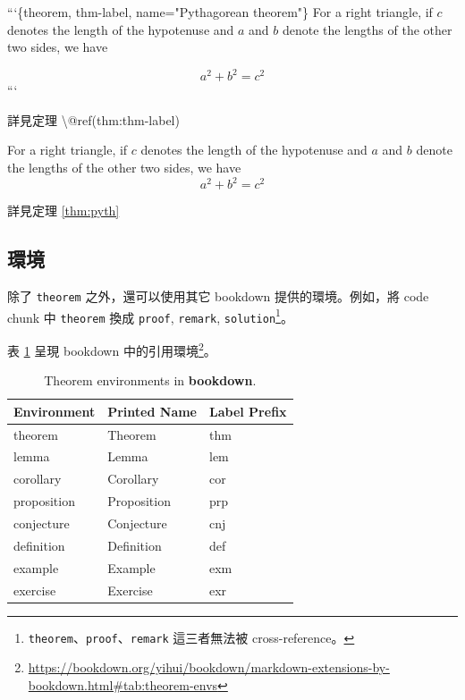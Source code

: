 \documentclass[oneside]{book}
\newenvironment{Shaded}{\begin{snugshade}}{\end{snugshade}}
\newcommand{\BaseNTok}[1]{\textcolor[rgb]{0.00,0.00,0.81}{#1}}
\newcommand{\NormalTok}[1]{#1}
\renewcommand{\href}[2]{#2\footnote{\url{#1}}}
\theoremstyle{definition}
\theoremstyle{definition}
\theoremstyle{definition}
\theoremstyle{remark}
\let\BeginKnitrBlock\begin \let\EndKnitrBlock\end
\begin{document}
\begin{Shaded}
\begin{Highlighting}[]
\BaseNTok{```\{theorem, thm-label, name="Pythagorean theorem"\}}
\BaseNTok{For a right triangle, if $c$ denotes the length of the hypotenuse}
\BaseNTok{and $a$ and $b$ denote the lengths of the other two sides, we have}

\BaseNTok{$$a^2 + b^2 = c^2$$}
\BaseNTok{```}

\NormalTok{詳見定理 \textbackslash{}@ref(thm:thm-label)}
\end{Highlighting}
\end{Shaded}

\BeginKnitrBlock{theorem}[Pythagorean theorem]
\protect\hypertarget{thm:pyth}{}{\label{thm:pyth} {} }For a right triangle, if \(c\) denotes the length of the hypotenuse
and \(a\) and \(b\) denote the lengths of the other two sides, we have
\[a^2 + b^2 = c^2\]
\EndKnitrBlock{theorem}

詳見定理 \ref{thm:pyth}

\hypertarget{environment}{%
\subsection{環境}\label{environment}}

除了 \texttt{theorem} 之外，還可以使用其它 bookdown 提供的環境。例如，將 code chunk 中 \texttt{theorem} 換成 \texttt{proof}, \texttt{remark}, \texttt{solution}\footnote{\texttt{theorem}、\texttt{proof}、\texttt{remark} 這三者無法被 cross-reference。}。

表 \ref{tab:theorem-envs} 呈現 bookdown 中的\href{https://bookdown.org/yihui/bookdown/markdown-extensions-by-bookdown.html\#tab:theorem-envs}{引用環境}。



\begin{table}[t]

\caption{\label{tab:theorem-envs}Theorem environments in \textbf{bookdown}.}
\centering
\begin{tabular}{lll}
\toprule
Environment & Printed Name & Label Prefix\\
\midrule
theorem & Theorem & thm\\
lemma & Lemma & lem\\
corollary & Corollary & cor\\
proposition & Proposition & prp\\
conjecture & Conjecture & cnj\\
\addlinespace
definition & Definition & def\\
example & Example & exm\\
exercise & Exercise & exr\\
\bottomrule
\end{tabular}
\end{table}
\end{document}
